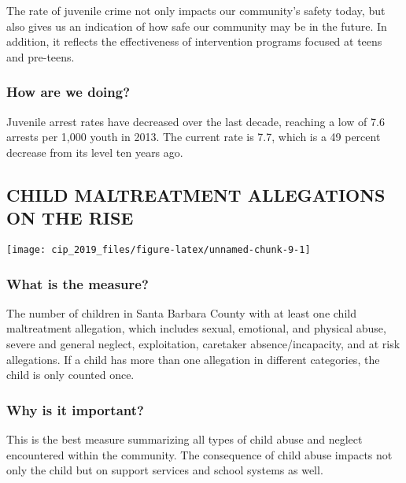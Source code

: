 \documentclass[]{book}
\theoremstyle{definition}
\theoremstyle{definition}
\theoremstyle{definition}
\theoremstyle{remark}
\begin{document}
The rate of juvenile crime not only impacts our community's safety
today, but also gives us an indication of how safe our community may be
in the future. In addition, it reflects the effectiveness of
intervention programs focused at teens and pre-teens.

\subsubsection*{How are we doing?}\label{how-are-we-doing-2}

Juvenile arrest rates have decreased over the last decade, reaching a
low of 7.6 arrests per 1,000 youth in 2013. The current rate is 7.7,
which is a 49 percent decrease from its level ten years ago.

\subsection*{CHILD MALTREATMENT ALLEGATIONS ON THE
RISE}\label{child-maltreatment-allegations-on-the-rise}

\texttt{[image: cip\_2019\_files/figure-latex/unnamed-chunk-9-1]}

\subsubsection*{What is the measure?}\label{what-is-the-measure-1}

The number of children in Santa Barbara County with at least one child
maltreatment allegation, which includes sexual, emotional, and physical
abuse, severe and general neglect, exploitation, caretaker
absence/incapacity, and at risk allegations. If a child has more than
one allegation in different categories, the child is only counted once.

\subsubsection*{Why is it important?}\label{why-is-it-important-1}

This is the best measure summarizing all types of child abuse and
neglect encountered within the community. The consequence of child abuse
impacts not only the child but on support services and school systems as
well.
\end{document}
